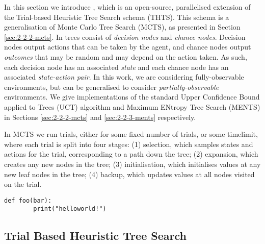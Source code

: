     In this section we introduce \thtspp\ewe \cite{thtspp}, which is an open-source, parallelised extension of the  Trial-based Heuristic Tree Search schema \cite{thts} (THTS). This schema is a generalisation of Monte Carlo Tree Search (MCTS), as presented in Section \ref{sec:2-2-2-mcts}. In \thtspp\ewe trees consist of \textit{decision nodes} and \textit{chance nodes}. Decision nodes output actions that can be taken by the agent, and chance nodes output \textit{outcomes} that may be random and may depend on the action taken. As such, each decision node has an associated \textit{state} and each chance node has an associated \textit{state-action pair}. In this work, we are considering fully-observable environments, but \thtspp\ewe can be generalised to consider \textit{partially-observable} environments. We give \thtspp\ewe implementations of the standard Upper Confidence Bound applied to Trees (UCT) algorithm and Maximum ENtropy Tree Search (MENTS) in Sections \ref{sec:2-2-2-mcts} and \ref{sec:2-2-3-ments} respectively.

    In MCTS we run trials, either for some fixed number of trials, or some timelimit, where each trial is split into four stages: 
        (1) selection, which samples states and actions for the trial, corresponding to a path down the tree;
        (2) expansion, which creates any new nodes in the tree; 
        (3) initialisation, which initialises values at any new leaf nodes in the tree;
        (4) backup, which updates values at all nodes visited on the trial.


    \begin{lstlisting}
def foo(bar):
        print("helloworld!")
    \end{lstlisting}

    \subsection{Trial Based Heuristic Tree Search}
    \label{sec:2-2-1-thts}
    
